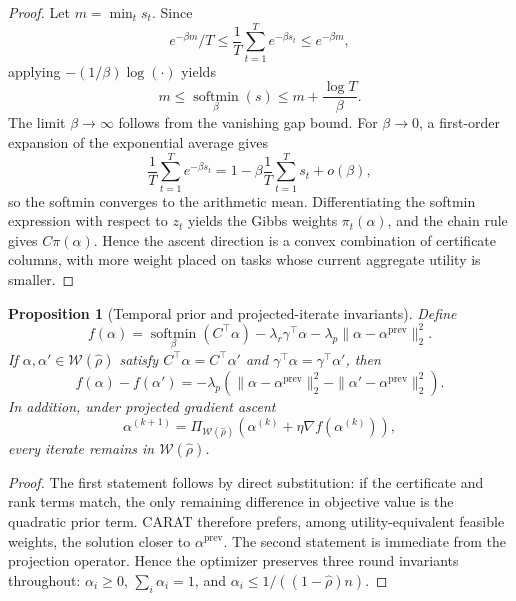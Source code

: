 \documentclass{article}
\newcommand{\softmin}{\operatorname*{softmin}}
\newtheorem{proposition}{Proposition}[section]
\begin{document}
\begin{proof}
Let $m=\min_t s_t$. Since
\[
e^{-\beta m}/T \le \frac{1}{T}\sum_{t=1}^T e^{-\beta s_t} \le e^{-\beta m},
\]
applying $-(1/\beta)\log(\cdot)$ yields
\[
m \le \softmin_{\beta}(s) \le m+\frac{\log T}{\beta}.
\]
The limit $\beta \to \infty$ follows from the vanishing gap bound. For $\beta \to 0$, a first-order expansion of the exponential average gives
\[
\frac{1}{T}\sum_{t=1}^T e^{-\beta s_t}
=
1-\beta \frac{1}{T}\sum_{t=1}^T s_t + o(\beta),
\]
so the softmin converges to the arithmetic mean. Differentiating the softmin expression with respect to $z_t$ yields the Gibbs weights $\pi_t(\alpha)$, and the chain rule gives $C\pi(\alpha)$. Hence the ascent direction is a convex combination of certificate columns, with more weight placed on tasks whose current aggregate utility is smaller.
\end{proof}

\begin{proposition}[Temporal prior and projected-iterate invariants]
\label{prop:temporal-prior}
Define
\[
f(\alpha)=\softmin_{\beta}(C^\top\alpha)-\lambda_r \gamma^\top\alpha-\lambda_p\|\alpha-\alpha^{\mathrm{prev}}\|_2^2.
\]
If $\alpha,\alpha' \in \mathcal{W}(\hat{\rho})$ satisfy $C^\top\alpha=C^\top\alpha'$ and $\gamma^\top\alpha=\gamma^\top\alpha'$, then
\[
f(\alpha)-f(\alpha')
=
-\lambda_p\!\left(\|\alpha-\alpha^{\mathrm{prev}}\|_2^2-\|\alpha'-\alpha^{\mathrm{prev}}\|_2^2\right).
\]
In addition, under projected gradient ascent
\[
\alpha^{(k+1)}=\Pi_{\mathcal{W}(\hat{\rho})}\!\left(\alpha^{(k)}+\eta \nabla f(\alpha^{(k)})\right),
\]
every iterate remains in $\mathcal{W}(\hat{\rho})$.
\end{proposition}

\begin{proof}
The first statement follows by direct substitution: if the certificate and rank terms match, the only remaining difference in objective value is the quadratic prior term. CARAT therefore prefers, among utility-equivalent feasible weights, the solution closer to $\alpha^{\mathrm{prev}}$. The second statement is immediate from the projection operator. Hence the optimizer preserves three round invariants throughout: $\alpha_i \ge 0$, $\sum_i \alpha_i =1$, and $\alpha_i \le 1/((1-\hat{\rho})n)$.
\end{proof}
\end{document}
